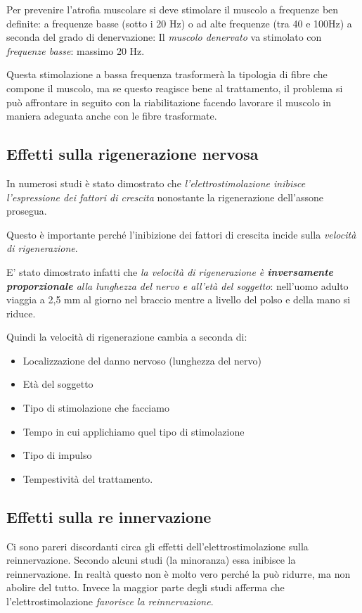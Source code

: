 Per prevenire l'atrofia muscolare si deve stimolare il muscolo a
frequenze ben definite: a frequenze basse (sotto i 20 Hz) o ad alte
frequenze (tra 40 e 100Hz) a seconda del grado di denervazione: Il
\emph{muscolo denervato} va stimolato con \emph{frequenze basse}:
massimo 20 Hz.

Questa stimolazione a bassa frequenza trasformerà la tipologia di fibre
che compone il muscolo, ma se questo reagisce bene al trattamento, il
problema si può affrontare in seguito con la riabilitazione facendo
lavorare il muscolo in maniera adeguata anche con le fibre trasformate.

\subsection{Effetti sulla rigenerazione nervosa}

In numerosi studi è stato dimostrato che \emph{l'elettrostimolazione
inibisce l'espressione dei fattori di crescita} nonostante la
rigenerazione dell'assone prosegua.

Questo è importante perché l'inibizione dei fattori di crescita incide
sulla \emph{velocità di rigenerazione}.

E' stato dimostrato infatti che \emph{la velocità di rigenerazione è
\textbf{inversamente proporzionale} alla lunghezza del nervo e all'età
del soggetto}: nell'uomo adulto viaggia a 2,5 mm al giorno nel braccio
mentre a livello del polso e della mano si riduce.

Quindi la velocità di rigenerazione cambia a seconda di:

\begin{itemize}
\item
  Localizzazione del danno nervoso (lunghezza del nervo)
\item
  Età del soggetto
\item
  Tipo di stimolazione che facciamo
\item
  Tempo in cui applichiamo quel tipo di stimolazione
\item
  Tipo di impulso
\item
  Tempestività del trattamento.
\end{itemize}

\subsection{Effetti sulla re innervazione}

Ci sono pareri discordanti circa gli effetti dell'elettrostimolazione
sulla reinnervazione. Secondo alcuni studi (la minoranza) essa inibisce
la reinnervazione. In realtà questo non è molto vero perché la può
ridurre, ma non abolire del tutto. Invece la maggior parte degli studi
afferma che l'elettrostimolazione \emph{favorisce la reinnervazione}.

